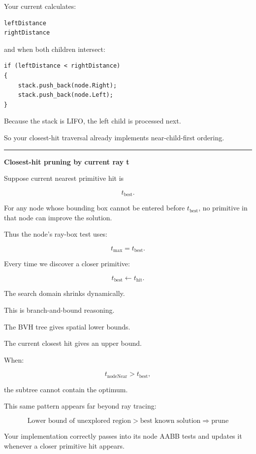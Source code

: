 Your current  calculates:

\begin{verbatim}
leftDistance
rightDistance
\end{verbatim}

and when both children intersect:

\begin{verbatim}
if (leftDistance < rightDistance)
{
    stack.push_back(node.Right);
    stack.push_back(node.Left);
}
\end{verbatim}

Because the stack is LIFO, the left child is processed next.

So your closest-hit traversal already implements near-child-first ordering.

\begin{center}\rule{0.5\linewidth}{0.5pt}\end{center}

\textbf{Closest-hit pruning by current ray t}

Suppose current nearest primitive hit is

\[
t_{\text{best}}.
\]

For any node whose bounding box cannot be entered before \(t_{\text{best}}\), no primitive in that node can improve the solution.

Thus the node's ray-box test uses:

\[
t_{\max}=t_{\text{best}}.
\]

Every time we discover a closer primitive:

\[
t_{\text{best}}
\leftarrow
t_{\text{hit}}.
\]

The search domain shrinks dynamically.

This is branch-and-bound reasoning.

The BVH tree gives spatial lower bounds.

The current closest hit gives an upper bound.

When:

\[
t_{\text{nodeNear}}>t_{\text{best}},
\]

the subtree cannot contain the optimum.

This same pattern appears far beyond ray tracing:

\[
\boxed{
\text{Lower bound of unexplored region}
>
\text{best known solution}
\Rightarrow
\text{prune}
}
\]

Your implementation correctly passes  into its node AABB tests and updates it whenever a closer primitive hit appears.

